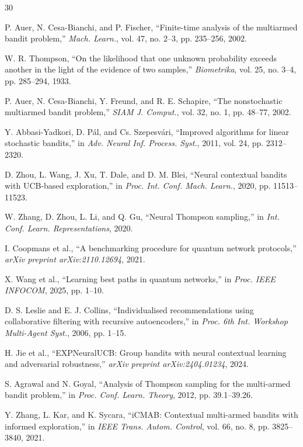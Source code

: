 \documentclass[10pt,twocolumn,journal]{IEEEtran}
\begin{document}
\begin{thebibliography}{30}

 P. Auer, N. Cesa-Bianchi, and P. Fischer, ``Finite-time analysis of the multiarmed bandit problem,'' \textit{Mach. Learn.}, vol. 47, no. 2--3, pp. 235--256, 2002.

 W. R. Thompson, ``On the likelihood that one unknown probability exceeds another in the light of the evidence of two samples,'' \textit{Biometrika}, vol. 25, no. 3--4, pp. 285--294, 1933.

 P. Auer, N. Cesa-Bianchi, Y. Freund, and R. E. Schapire, ``The nonstochastic multiarmed bandit problem,'' \textit{SIAM J. Comput.}, vol. 32, no. 1, pp. 48--77, 2002.

 Y. Abbasi-Yadkori, D. Pál, and Cs. Szepesvári, ``Improved algorithms for linear stochastic bandits,'' in \textit{Adv. Neural Inf. Process. Syst.}, 2011, vol. 24, pp. 2312--2320.

 D. Zhou, L. Wang, J. Xu, T. Dale, and D. M. Blei, ``Neural contextual bandits with UCB-based exploration,'' in \textit{Proc. Int. Conf. Mach. Learn.}, 2020, pp. 11513--11523.

 W. Zhang, D. Zhou, L. Li, and Q. Gu, ``Neural Thompson sampling,'' in \textit{Int. Conf. Learn. Representations}, 2020.

 I. Coopmans et al., ``A benchmarking procedure for quantum network protocols,'' \textit{arXiv preprint arXiv:2110.12694}, 2021.

 X. Wang et al., ``Learning best paths in quantum networks,'' in \textit{Proc. IEEE INFOCOM}, 2025, pp. 1--10.

 D. S. Leslie and E. J. Collins, ``Individualised recommendations using collaborative filtering with recursive autoencoders,'' in \textit{Proc. 6th Int. Workshop Multi-Agent Syst.}, 2006, pp. 1--15.

 H. Jie et al., ``EXPNeuralUCB: Group bandits with neural contextual learning and adversarial robustness,'' \textit{arXiv preprint arXiv:2404.01234}, 2024.

 S. Agrawal and N. Goyal, ``Analysis of Thompson sampling for the multi-armed bandit problem,'' in \textit{Proc. Conf. Learn. Theory}, 2012, pp. 39.1--39.26.

 Y. Zhang, L. Kar, and K. Sycara, ``iCMAB: Contextual multi-armed bandits with informed exploration,'' in \textit{IEEE Trans. Autom. Control}, vol. 66, no. 8, pp. 3825--3840, 2021.

\end{thebibliography}
\end{document}
